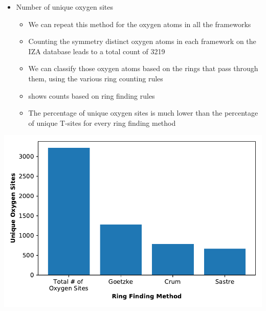 \documentclass[11pt]{article}
\begin{document}
\begin{itemize}
\item Number of unique oxygen sites
\begin{itemize}
\item We can repeat this method for the oxygen atoms in all the frameworks
\item Counting the symmetry distinct oxygen atoms in each framework on the IZA database leads to a total count of 3219
\item We can classify those oxygen atoms based on the rings that pass through them, using the various ring counting rules
\item {} shows counts based on ring finding rules
\item The percentage of unique oxygen sites is much lower than the percentage of unique T-sites for every ring finding method
\end{itemize}
\end{itemize}

\begin{center}
\includegraphics[width=.6\textwidth]{../figures/completed-figures/unique-os.pdf}
\end{center}
\end{document}
